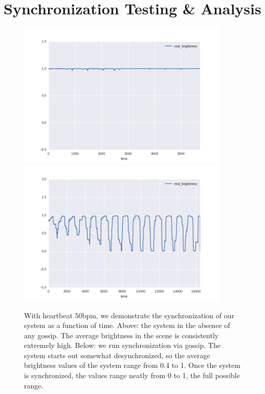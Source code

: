 \documentclass[preprint,review,12pt]{cs262}
\begin{document}
\section{Synchronization Testing \& Analysis}

\begin{figure}
\thispagestyle{empty}
\vspace{-10 mm}
  \centering
    \includegraphics[width=0.9\textwidth]{figures/bad_synch.png}
  \includegraphics[width=0.9\textwidth]{figures/graph_well_synched.png}
  \caption{With heartbeat 50bpm, we demonstrate the synchronization of our system as a function of time. Above: the system in the absence of any gossip. The average brightness in the scene is consistently extremely high. Below: we run synchronization via gossip. The system starts out somewhat desynchronized, so the average brightness values of the system range from 0.4 to 1. Once the system is synchronized, the values range neatly from 0 to 1, the full possible range. 
 \label{fig:res}}
\end{figure}
\end{document}
